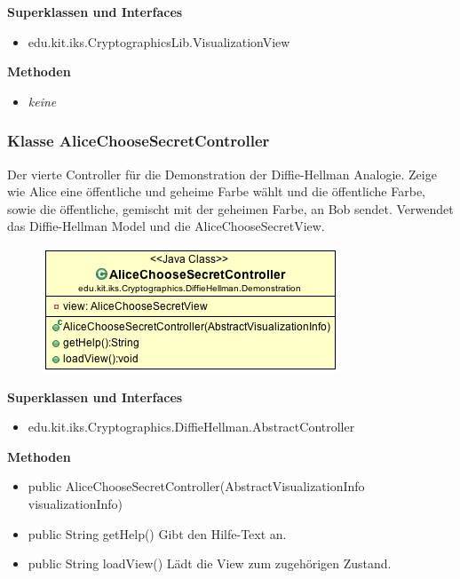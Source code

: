 \documentclass{article}
\begin{document}
      \textbf{Superklassen und Interfaces}
      \begin{itemize}
        \item edu.kit.iks.CryptographicsLib.VisualizationView
      \end{itemize}

      \textbf{Methoden}
      \begin{itemize}
        \item \textit{keine}
      \end{itemize}

\subsubsection{Klasse AliceChooseSecretController}
      Der vierte Controller für die Demonstration der Diffie-Hellman Analogie.
      Zeige wie Alice eine öffentliche und geheime Farbe wählt und 
      die öffentliche Farbe, sowie die öffentliche, gemischt mit der geheimen Farbe,
      an Bob sendet.
      Verwendet das Diffie-Hellman Model und die AliceChooseSecretView.

      \begin{figure}[H]
        \centering
        \includegraphics{resources/edu-kit-iks-Cryptographics-DiffieHellman-Demonstration-AliceChooseSecretController}
      \end{figure}

      \textbf{Superklassen und Interfaces}
      \begin{itemize}
        \item edu.kit.iks.Cryptographics.DiffieHellman.AbstractController
      \end{itemize}

      \textbf{Methoden}
      \begin{itemize}
          \item public AliceChooseSecretController(AbstractVisualizationInfo visualizationInfo)
        \item public String getHelp() \newline
        Gibt den Hilfe-Text an.
        \item public String loadView() \newline
        Lädt die View zum zugehörigen Zustand.
      \end{itemize}
\end{document}
